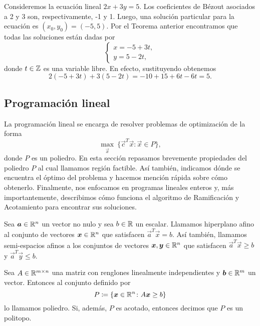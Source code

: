 \begin{example}
	Consideremos la ecuación lineal $2x + 3y = 5$. Los coeficientes de Bézout asociados a 2 y 3 son,
	respectivamente, -1 y 1. Luego, una solución particular para la ecuación es $(x_0, y_0) = (-5, 5)$.
	Por el Teorema anterior encontramos que todas las soluciones están dadas por
	\begin{equation*}
		\begin{cases}
			x = -5 + 3t, \\
			y = 5 - 2t,
		\end{cases}
	\end{equation*}
	donde $t \in \mathbb{Z}$ es una variable libre. En efecto, sustituyendo obtenemos
	\begin{equation*}
		2(-5 + 3t) + 3(5 - 2t) = -10 + 15 + 6t - 6t = 5.
	\end{equation*}
\end{example}

\subsection{Programación lineal}
\noindent
La programación lineal se encarga de resolver problemas de optimización de la forma
\begin{equation}
	\label{prim:lineal-opt}
	\max_{\vec{x}} ~\lbrace \vec{c}^T\vec{x} \colon \vec{x} \in P \rbrace,
\end{equation}
donde $P$ es un poliedro. En esta sección repasamos brevemente propiedades del poliedro $P$ al cual
llamamos región factible. Así también, indicamos dónde se encuentra el óptimo del problema y
hacemos mención rápida sobre cómo obtenerlo. Finalmente, nos enfocamos en programas lineales enteros
y, más importantemente, describimos cómo funciona el algoritmo de Ramificación y Acotamiento para
encontrar sus soluciones.

\begin{definition}
	Sea $\boldsymbol{a} \in \mathbb{R}^n$ un vector no nulo y sea $b \in \mathbb{R}$ un escalar. Llamamos hiperplano afino
	al conjunto de vectores $\boldsymbol{x} \in \mathbb{R}^n$ que satisfacen $\vec{a}^T\vec{x} = b$. Así también,
	llamamos semi-espacios afinos a los conjuntos de vectores $\boldsymbol{x}, \boldsymbol{y} \in \mathbb{R}^n$ que
	satisfacen $\vec{a}^T\vec{x} \geq b$ y $\vec{a}^T\vec{y} \leq b$.
\end{definition}

\begin{definition}
	Sea $A \in \mathbb{R}^{m \times n}$ una matriz con renglones linealmente independientes y $\boldsymbol{b} \in
	\mathbb{R}^m$ un vector. Entonces al conjunto definido por
	\begin{equation}
		\label{prerreq:def:poly}
		P \coloneq \lbrace \boldsymbol{x} \in \mathbb{R}^n \colon A\boldsymbol{x} \geq b \rbrace
	\end{equation}
	lo llamamos poliedro. Si, además, $P$ es acotado, entonces decimos que $P$ es un politopo.
\end{definition}

